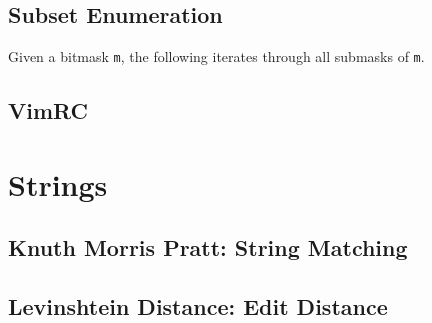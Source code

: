\documentclass[letterpaper,11pt,twoside]{article}
\begin{document}
            \subsection{Subset Enumeration}
                Given a bitmask \verb|m|, the following iterates through all submasks of \verb|m|.
                
                
            \subsection{VimRC}
                
        \section{Strings}
            \subsection{Knuth Morris Pratt: String Matching} \label{kmp}
            \subsection{Levinshtein Distance: Edit Distance}
\end{document}
